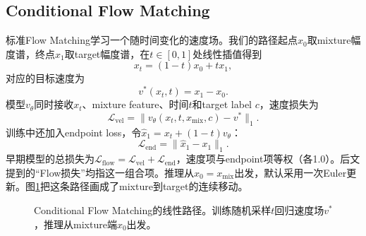 \documentclass[UTF8,12pt,a4paper]{ctexart}
\begin{document}
\subsection{Conditional Flow Matching}

标准Flow Matching学习一个随时间变化的速度场。我们的路径起点$x_0$取mixture幅度谱，终点$x_1$取target幅度谱，在$t\in[0,1]$处线性插值得到
\begin{equation}
  x_t=(1-t)x_0+tx_1,
\end{equation}
对应的目标速度为
\begin{equation}
  v^*(x_t,t)=x_1-x_0.
\end{equation}
模型$v_\theta$同时接收$x_t$、mixture feature、时间$t$和target label $c$，速度损失为
\begin{equation}
  \mathcal L_{\mathrm{vel}}=\lVert v_\theta(x_t,t,x_{\mathrm{mix}},c)-v^*\rVert_1.
\end{equation}
训练中还加入endpoint loss，令$\hat x_1=x_t+(1-t)v_\theta$：
\begin{equation}
  \mathcal L_{\mathrm{end}}=\|\hat x_1-x_1\|_1.
\end{equation}
早期模型的总损失为$\mathcal L_{\mathrm{flow}}=\mathcal L_{\mathrm{vel}}+\mathcal L_{\mathrm{end}}$，速度项与endpoint项等权（各1.0）。后文提到的“Flow损失”均指这一组合项。推理从$x_0=x_{\mathrm{mix}}$出发，默认采用一次Euler更新。图\ref{fig:flow-path}把这条路径画成了mixture到target的连续移动。

\begin{figure}[H]
  \centering
  \caption{Conditional Flow Matching的线性路径。训练随机采样$t$回归速度场$v^*$，推理从mixture端$x_0$出发。}
  \label{fig:flow-path}
\end{figure}
\end{document}
